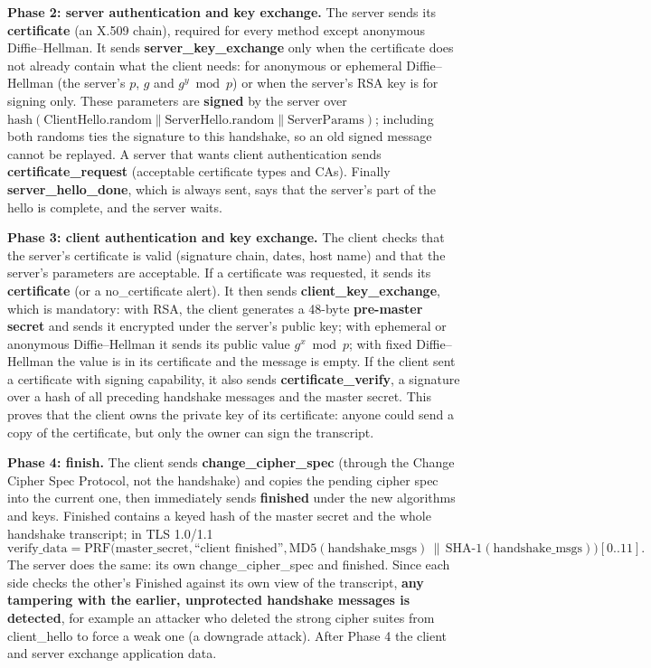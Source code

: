 \textbf{Phase 2: server authentication and key exchange.} The server sends its \textbf{certificate} (an X.509 chain), required for every method except anonymous Diffie--Hellman. It sends \textbf{server\_key\_exchange} only when the certificate does not already contain what the client needs: for anonymous or ephemeral Diffie--Hellman (the server's $p$, $g$ and $g^y \bmod p$) or when the server's RSA key is for signing only. These parameters are \textbf{signed} by the server over $\mathrm{hash}(\text{ClientHello.random} \| \text{ServerHello.random} \| \text{ServerParams})$; including both randoms ties the signature to this handshake, so an old signed message cannot be replayed. A server that wants client authentication sends \textbf{certificate\_request} (acceptable certificate types and CAs). Finally \textbf{server\_hello\_done}, which is always sent, says that the server's part of the hello is complete, and the server waits.

\textbf{Phase 3: client authentication and key exchange.} The client checks that the server's certificate is valid (signature chain, dates, host name) and that the server's parameters are acceptable. If a certificate was requested, it sends its \textbf{certificate} (or a no\_certificate alert). It then sends \textbf{client\_key\_exchange}, which is mandatory: with RSA, the client generates a 48-byte \textbf{pre-master secret} and sends it encrypted under the server's public key; with ephemeral or anonymous Diffie--Hellman it sends its public value $g^x \bmod p$; with fixed Diffie--Hellman the value is in its certificate and the message is empty. If the client sent a certificate with signing capability, it also sends \textbf{certificate\_verify}, a signature over a hash of all preceding handshake messages and the master secret. This proves that the client owns the private key of its certificate: anyone could send a copy of the certificate, but only the owner can sign the transcript.

\textbf{Phase 4: finish.} The client sends \textbf{change\_cipher\_spec} (through the Change Cipher Spec Protocol, not the handshake) and copies the pending cipher spec into the current one, then immediately sends \textbf{finished} under the new algorithms and keys. Finished contains a keyed hash of the master secret and the whole handshake transcript; in TLS 1.0/1.1
\[
\text{verify\_data} = \mathrm{PRF}\big(\text{master\_secret}, \text{``client finished''}, \mathrm{MD5}(\text{handshake\_msgs}) \,\|\, \mathrm{SHA\text{-}1}(\text{handshake\_msgs})\big)[0..11].
\]
The server does the same: its own change\_cipher\_spec and finished. Since each side checks the other's Finished against its own view of the transcript, \textbf{any tampering with the earlier, unprotected handshake messages is detected}, for example an attacker who deleted the strong cipher suites from client\_hello to force a weak one (a downgrade attack). After Phase 4 the client and server exchange application data.

